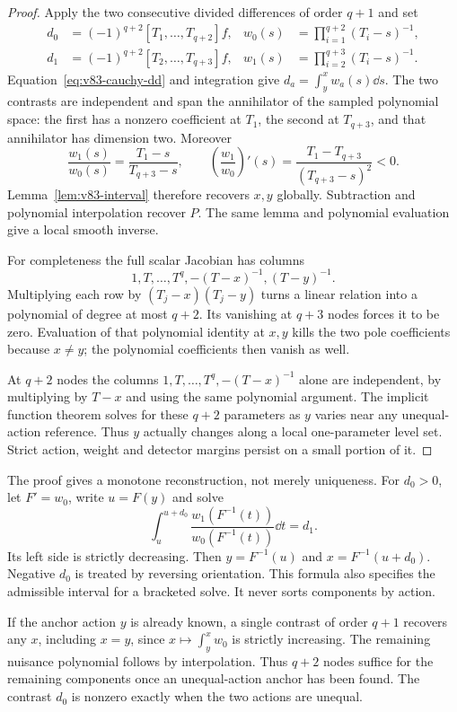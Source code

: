 \begin{proof}
Apply the two consecutive divided differences of order $q+1$ and set
\begin{align}
 d_0&=(-1)^{q+2}[T_1,\ldots,T_{q+2}]f,
 &w_0(s)&=\prod_{i=1}^{q+2}(T_i-s)^{-1},\label{eq:v83-contrasts}\\
 d_1&=(-1)^{q+2}[T_2,\ldots,T_{q+3}]f,
 &w_1(s)&=\prod_{i=2}^{q+3}(T_i-s)^{-1}.\nonumber
\end{align}
Equation~\eqref{eq:v83-cauchy-dd} and integration give
$d_a=\int_y^x w_a(s)\dd s$. The two contrasts are independent
and span the annihilator of the sampled polynomial space: the first
has a nonzero coefficient at $T_1$, the second at $T_{q+3}$, and
that annihilator has dimension two. Moreover
\begin{equation}\label{eq:v83-ratio}
 \frac{w_1(s)}{w_0(s)}=\frac{T_1-s}{T_{q+3}-s},\qquad
 \left(\frac{w_1}{w_0}\right)'(s)
       =\frac{T_1-T_{q+3}}{(T_{q+3}-s)^2}<0.
\end{equation}
Lemma~\ref{lem:v83-interval} therefore recovers $x,y$ globally.
Subtraction and polynomial interpolation recover $P$. The same lemma
and polynomial evaluation give a local smooth inverse.

For completeness the full scalar Jacobian has columns
\[
 1,T,\ldots,T^q,-(T-x)^{-1},(T-y)^{-1}.
\]
Multiplying each row by $(T_j-x)(T_j-y)$ turns a linear relation
into a polynomial of degree at most $q+2$. Its vanishing at $q+3$
nodes forces it to be zero. Evaluation of that polynomial identity at
$x,y$ kills the two pole coefficients because $x\ne y$; the
polynomial coefficients then vanish as well.

At $q+2$ nodes the columns $1,T,\ldots,T^q,-(T-x)^{-1}$ alone are
independent, by multiplying by $T-x$ and using the same polynomial
argument. The implicit function theorem solves for these $q+2$
parameters as $y$ varies near any unequal-action reference. Thus $y$
actually changes along a local one-parameter level set. Strict action,
weight and detector margins persist on a small portion of it.
\end{proof}

The proof gives a monotone reconstruction, not merely uniqueness. For
$d_0>0$, let $F'=w_0$, write $u=F(y)$ and solve
\begin{equation}\label{eq:v83-monotone-solve}
 \int_u^{u+d_0}\frac{w_1(F^{-1}(t))}{w_0(F^{-1}(t))}\dd t=d_1.
\end{equation}
Its left side is strictly decreasing. Then
$y=F^{-1}(u)$ and $x=F^{-1}(u+d_0)$. Negative $d_0$ is treated
by reversing orientation. This formula also specifies the admissible
interval for a bracketed solve. It never sorts components by action.

If the anchor action $y$ is already known, a single contrast of order
$q+1$ recovers any $x$, including $x=y$, since
$x\mapsto\int_y^x w_0$ is strictly increasing. The remaining nuisance
polynomial follows by interpolation. Thus $q+2$ nodes suffice for the
remaining components once an unequal-action anchor has been found.
The contrast $d_0$ is nonzero exactly when the two actions are unequal.
